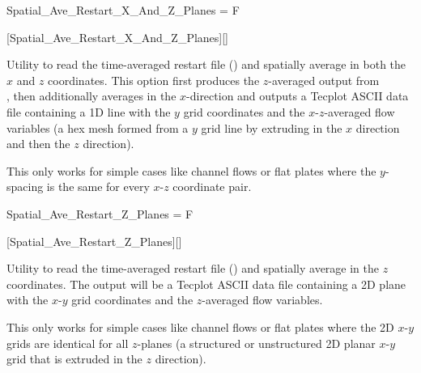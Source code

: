 
\begin{nmldescitem}
Spatial_Ave_Restart_X_And_Z_Planes = F
\end{nmldescitem}
[Spatial\_Ave\_Restart\_X\_And\_Z\_Planes][]

\begin{nmldescbody}
Utility to read the time-averaged restart file
()
and spatially average in both the $x$ and $z$ coordinates.
%
This option first produces the $z$-averaged output from
\\%
,
then additionally averages in the $x$-direction
and outputs a Tecplot ASCII data file containing
a 1D line with the $y$ grid coordinates and the
$x$-$z$-averaged flow variables
(\forexample a hex mesh formed from a $y$ grid line by extruding
in the $x$ direction and then the $z$ direction).

\NOTE
This only works for simple cases like channel flows or flat plates
where the $y$-spacing is the same for every $x$-$z$ coordinate pair.

\end{nmldescbody}


\begin{nmldescitem}
Spatial_Ave_Restart_Z_Planes = F
\end{nmldescitem}
[Spatial\_Ave\_Restart\_Z\_Planes][]

\begin{nmldescbody}
Utility to read the time-averaged restart file
()
and spatially average in the $z$ coordinates.
%
The output will be a Tecplot ASCII data file containing
a 2D plane with the $x$-$y$ grid coordinates and the
$z$-averaged flow variables.

\NOTE
This only works for simple cases like channel flows or flat plates
where the 2D $x$-$y$ grids are identical for all $z$-planes
(\forexample a structured or unstructured 2D planar $x$-$y$ grid
that is extruded in the $z$ direction).

\end{nmldescbody}


